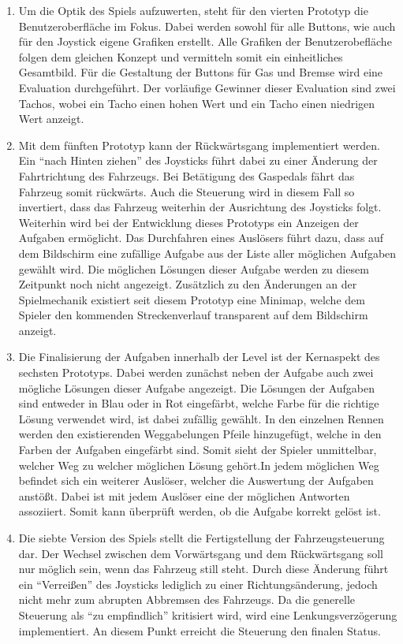 \begin{enumerate}[itemindent=*,label=\textbf{Prototyp \arabic*}]
		\item{ Um die Optik des Spiels aufzuwerten, steht für den vierten Prototyp die Benutzeroberfläche im Fokus. Dabei werden sowohl für alle Buttons, wie auch für den Joystick eigene Grafiken erstellt. Alle Grafiken der Benutzerobefläche folgen dem gleichen Konzept und vermitteln somit ein einheitliches Gesamtbild. Für die Gestaltung der Buttons für Gas und Bremse wird eine Evaluation durchgeführt. Der vorläufige Gewinner dieser Evaluation sind zwei Tachos, wobei ein Tacho einen hohen Wert und ein Tacho einen niedrigen Wert anzeigt. }
		\item{ Mit dem fünften Prototyp kann der Rückwärtsgang implementiert werden. Ein \enquote{nach Hinten ziehen} des Joysticks führt dabei zu einer Änderung der Fahrtrichtung des Fahrzeugs. Bei Betätigung des Gaspedals fährt das Fahrzeug somit rückwärts. Auch die Steuerung wird in diesem Fall so invertiert, dass das Fahrzeug weiterhin der Ausrichtung des Joysticks folgt. Weiterhin wird bei der Entwicklung dieses Prototyps ein Anzeigen der Aufgaben ermöglicht. Das Durchfahren eines Auslösers führt dazu, dass auf dem Bildschirm eine zufällige Aufgabe aus der Liste aller möglichen Aufgaben gewählt wird. Die möglichen Lösungen dieser Aufgabe werden zu diesem Zeitpunkt noch nicht angezeigt. Zusätzlich zu den Änderungen an der Spielmechanik existiert seit diesem Prototyp eine Minimap, welche dem Spieler den kommenden Streckenverlauf transparent auf dem Bildschirm anzeigt. }
		\item{ Die Finalisierung der Aufgaben innerhalb der Level ist der Kernaspekt des sechsten Prototyps. Dabei werden zunächst neben der Aufgabe auch zwei mögliche Lösungen dieser Aufgabe angezeigt. Die Lösungen der Aufgaben sind entweder in Blau oder in Rot eingefärbt, welche Farbe für die richtige Lösung verwendet wird, ist dabei zufällig gewählt. In den einzelnen Rennen werden den existierenden Weggabelungen Pfeile hinzugefügt, welche in den Farben der Aufgaben eingefärbt sind. Somit sieht der Spieler unmittelbar, welcher Weg zu welcher möglichen Lösung gehört.In jedem möglichen Weg befindet sich ein weiterer Auslöser, welcher die Auswertung der Aufgaben anstößt. Dabei ist mit jedem Auslöser eine der möglichen Antworten assoziiert. Somit kann überprüft werden, ob die Aufgabe korrekt gelöst ist. }
		\item{ Die siebte Version des Spiels stellt die Fertigstellung der Fahrzeugsteuerung dar. Der Wechsel zwischen dem Vorwärtsgang und dem Rückwärtsgang soll nur möglich sein, wenn das Fahrzeug still steht. Durch diese Änderung führt ein \enquote{Verreißen} des Joysticks lediglich zu einer Richtungsänderung, jedoch nicht mehr zum abrupten Abbremsen des Fahrzeugs. Da die generelle Steuerung als \enquote{zu empfindlich} kritisiert wird, wird eine Lenkungsverzögerung implementiert. An diesem Punkt erreicht die Steuerung den finalen Status.}

\end{enumerate}
